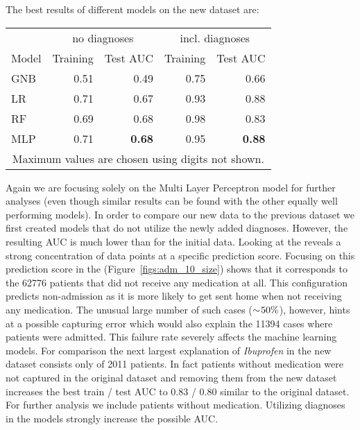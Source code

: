 The best results of different models on the new dataset are:

\begin{center}
\begin{tabular}{l|rr|rr}
\multicolumn{1}{c}{} & \multicolumn{2}{c}{no diagnoses} & \multicolumn{2}{c}{incl. diagnoses}\\
Model & Training & Test AUC & Training & Test AUC\\
\hline
GNB & 0.51 & 0.49 & 0.75 & 0.66 \\
LR & 0.71 & 0.67 & 0.93 & 0.88 \\
RF & 0.69 & 0.68 & 0.98 & 0.83 \\
MLP & 0.71 & \textbf{0.68} & 0.95 & \textbf{0.88} \\
\multicolumn{5}{c}{{\scriptsize Maximum values are chosen using digits not shown.}} \\
\end{tabular}
\end{center}

Again we are focusing solely on the Multi Layer Perceptron model for further analyses (even though similar results can be found with the other equally well performing models).
In order to compare our new data to the previous dataset we first created models that do not utilize the newly added diagnoses.
However, the resulting AUC is much lower than for the initial data.
Looking at the \tabA reveals a strong concentration of data points at a specific prediction score.
Focusing on this prediction score in the \tabB (Figure~\ref{figs:adm_10_size}) shows that it corresponds to the 62776 patients that did not receive any medication at all.
This configuration predicts non-admission as it is more likely to get sent home when not receiving any medication.
The unusual large number of such cases ($\sim\hspace{-0.2em}50\%$), however, hints at a possible capturing error which would also explain the 11394 cases where patients were admitted.
This failure rate severely affects the machine learning models.
For comparison the next largest explanation of \emph{Ibuprofen} in the new dataset consists only of 2011 patients.
In fact patients without medication were not captured in the original dataset and removing them from the new dataset increases the best train / test AUC to $0.83$ / $0.80$ similar to the original dataset.
For further analysis we include patients without medication.
Utilizing diagnoses in the models strongly increase the possible AUC.


